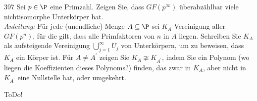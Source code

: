 \begin{algebraUE}{397}
Sei $p \in \P$ eine Primzahl. Zeigen Sie, dass $GF(p^{\infty})$ überabzählbar viele
nichtisomorphe Unterkörper hat. \\
\textit{Anleitung:} Für jede (unendliche) Menge $A \subseteq \P$ sei $K_A$ Vereinigung
aller $GF(p^n)$, für die gilt, dass alle Primfaktoren von $n$ in $A$ liegen.
Schreiben Sie $K_A$ als aufsteigende Vereinigung $\bigcup_{j=1}^{\infty}U_j$
von Unterkörpern, um zu beweisen, dass $K_A$ ein Körper ist. Für $A \neq A^{\prime}$
zeigen Sie $K_A \ncong K_{A^\prime}$, indem Sie ein Polynom (wo liegen die
Koeffizienten dieses Polynoms?) finden, das zwar in $K_A$, aber nicht in $K_{A^{\prime}}$
eine Nullstelle hat, oder umgekehrt.
\end{algebraUE}

\begin{solution}

ToDo!

\end{solution}
